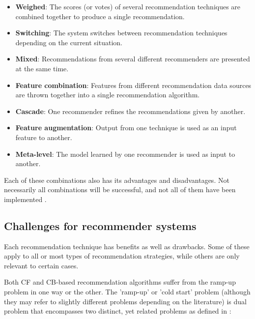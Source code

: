 \begin{itemize}
	\item \textbf{Weighed}: The scores (or votes) of several recommendation techniques are combined together to produce a single recommendation.
	\item \textbf{Switching}: The system switches between recommendation techniques depending on the current situation.
	\item \textbf{Mixed}: Recommendations from several different recommenders are presented at the same time.
	\item \textbf{Feature combination}: Features from different recommendation data sources are thrown together into a single recommendation algorithm.
	\item \textbf{Cascade}: One recommender refines the recommendations given by another.
	\item \textbf{Feature augmentation}: Output from one technique is used as an input feature to another.
	\item \textbf{Meta-level}: The model learned by one recommender is used as input to another.
\end{itemize}

Each of these combinations also has its advantages and disadvantages. Not necessarily all combinations will be successful, and not all of them have been implemented \cite{burke:2002}.



\subsection{Challenges for recommender systems}\label{chapter:literature_study:section:computer:subsection:challenges}


Each recommendation technique has benefits as well as drawbacks. Some of these apply to all or most types of recommendation strategies, while others are only relevant to certain cases.



Both CF and CB-based recommendation algorithms suffer from the ramp-up problem in one way or the other. The 'ramp-up' or 'cold start' problem (although they may refer to slightly different problems depending on the literature) is dual problem that encompasses two distinct, yet related problems as defined in \cite{burke:2002}:

